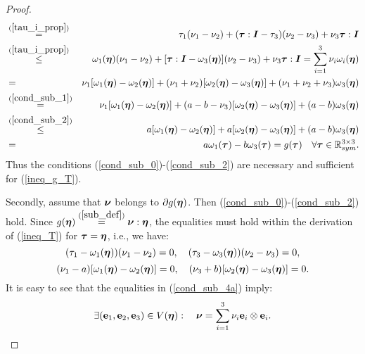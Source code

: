 \documentclass[a4paper,12pt]{article}
\theoremstyle{remark}
\newcommand{\mbf}[1]{\mbox{\boldmath$#1$}}
\numberwithin{equation}{section}
\begin{document}
\begin{proof}
\begin{eqnarray}
&\stackrel{(\ref{tau_i_prop})}{=}&\tau_1(\nu_1- \nu_2)+(\mbf\tau:\mbf I-\tau_3)(\nu_2-\nu_3)+\nu_3\mbf\tau:\mbf I\nonumber\\
&\stackrel{(\ref{tau_i_prop})}{\leq}&\omega_1(\mbf\eta)(\nu_1- \nu_2)+[\mbf\tau:\mbf I-\omega_3(\mbf\eta)](\nu_2-\nu_3)+\nu_3\mbf\tau:\mbf I\nonumber=\sum_{i=1}^3\nu_i\omega_i(\mbf\eta)\\
&=&\nu_1[\omega_1(\mbf\eta)-\omega_2(\mbf\eta)]+(\nu_1+\nu_2)[\omega_2(\mbf\eta)-\omega_3(\mbf\eta)]+(\nu_1+\nu_2+\nu_3)\omega_3(\mbf\eta)\nonumber\\
&\stackrel{(\ref{cond_sub_1})}{=}&\nu_1[\omega_1(\mbf\eta)-\omega_2(\mbf\eta)]+(a-b-\nu_3)[\omega_2(\mbf\eta)-\omega_3(\mbf\eta)]+(a-b)\omega_3(\mbf\eta)\nonumber\\
&\stackrel{(\ref{cond_sub_2})}{\leq}&a[\omega_1(\mbf\eta)-\omega_2(\mbf\eta)]+a[\omega_2(\mbf\eta)-\omega_3(\mbf\eta)]+(a-b)\omega_3(\mbf\eta)\nonumber\\
&=&a\omega_1(\mbf\tau)-b\omega_3(\mbf\tau)=g(\mbf\tau)\quad\forall \mbf\tau\in\mathbb R^{3\times 3}_{sym}.
\label{ineq_T}
\end{eqnarray}
Thus the conditions (\ref{cond_sub_0})-(\ref{cond_sub_2}) are necessary and sufficient for (\ref{ineq_g_T}).

Secondly, assume that $\mbf\nu$ belongs to $\partial g(\mbf\eta)$. Then (\ref{cond_sub_0})-(\ref{cond_sub_2}) hold. Since  $g(\mbf\eta)\stackrel{(\ref{sub_def})}{=}\mbf\nu:\mbf\eta$, the equalities must hold within the derivation of (\ref{ineq_T}) for $\mbf\tau=\mbf\eta$, i.e., we have:
\begin{equation}
(\tau_1-\omega_1(\mbf\eta))(\nu_1- \nu_2)=0,\quad (\tau_3-\omega_3(\mbf\eta))(\nu_2- \nu_3)=0,
\label{cond_sub_4a}
\end{equation}
\begin{equation}
(\nu_1-a)[\omega_1(\mbf\eta)-\omega_2(\mbf\eta)]=0,\quad (\nu_3+b)[\omega_2(\mbf\eta)-\omega_3(\mbf\eta)]=0.
\label{cond_sub_7}
\end{equation}
It is easy to see that the equalities in (\ref{cond_sub_4a}) imply:
\begin{equation}
\exists (\mathbf e_1, \mathbf e_2, \mathbf e_3)\in V(\mbf\eta):\quad \mbf\nu=\sum_{i=1}^3\nu_i\mathbf e_i\otimes\mathbf e_i.
\label{cond_sub_8}
\end{equation}


\end{proof}
\end{document}
